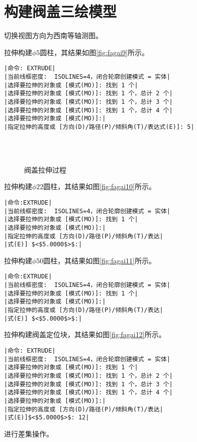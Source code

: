 \section{构建阀盖三绘模型}
\begin{procedure}
\item 切换视图方向为西南等轴测图。
\item 拉伸构建$\phi 5$圆柱，其结果如图\ref{fig:fagai9}所示。
\begin{lstlisting}
|命令: EXTRUDE|
|当前线框密度:  ISOLINES=4，闭合轮廓创建模式 = 实体|
|选择要拉伸的对象或 [模式(MO)]: 找到 1 个|
|选择要拉伸的对象或 [模式(MO)]: 找到 1 个，总计 2 个|
|选择要拉伸的对象或 [模式(MO)]: 找到 1 个，总计 3 个|
|选择要拉伸的对象或 [模式(MO)]: 找到 1 个，总计 4 个|
|选择要拉伸的对象或 [模式(MO)]:|
|指定拉伸的高度或 [方向(D)/路径(P)/倾斜角(T)/表达式(E)]: 5|
\end{lstlisting}
\begin{figure}[htbp]
\centering
{}\hspace{30pt}
\\
\hspace{30pt}
\\
\caption{阀盖拉伸过程}
\end{figure}
\item 拉伸构建$\phi 22$圆柱，其结果如图\ref{fig:fagai10}所示。
\begin{lstlisting}
|命令:EXTRUDE|
|当前线框密度:  ISOLINES=4，闭合轮廓创建模式 = 实体|
|选择要拉伸的对象或 [模式(MO)]: 找到 1 个|
|选择要拉伸的对象或 [模式(MO)]:|
|指定拉伸的高度或 [方向(D)/路径(P)/倾斜角(T)/表达|
|式(E)] $<$5.0000$>$:|
\end{lstlisting}
\item 拉伸构建$\phi 50$圆柱，其结果如图\ref{fig:fagai11}所示。
\begin{lstlisting}
|命令:EXTRUDE|
|当前线框密度:  ISOLINES=4，闭合轮廓创建模式 = 实体|
|选择要拉伸的对象或 [模式(MO)]: 找到 1 个|
|选择要拉伸的对象或 [模式(MO)]:|
|指定拉伸的高度或 [方向(D)/路径(P)/倾斜角(T)/表达|
|式(E)] $<$5.0000$>$:|
\end{lstlisting}
\item 拉伸构建阀盖定位块，其结果如图\ref{fig:fagai12}所示。
\begin{lstlisting}
|命令: EXTRUDE|
|当前线框密度:  ISOLINES=4，闭合轮廓创建模式 = 实体|
|选择要拉伸的对象或 [模式(MO)]: 找到 1 个|
|选择要拉伸的对象或 [模式(MO)]: 找到 1 个，总计 2 个|
|选择要拉伸的对象或 [模式(MO)]: 找到 1 个，总计 3 个|
|选择要拉伸的对象或 [模式(MO)]: 找到 1 个，总计 4 个|
|选择要拉伸的对象或 [模式(MO)]:|
|指定拉伸的高度或 [方向(D)/路径(P)/倾斜角(T)/表达|
|式(E)]$<$5.0000$>$: 12|
\end{lstlisting}
\item 进行差集操作。


\end{procedure}

